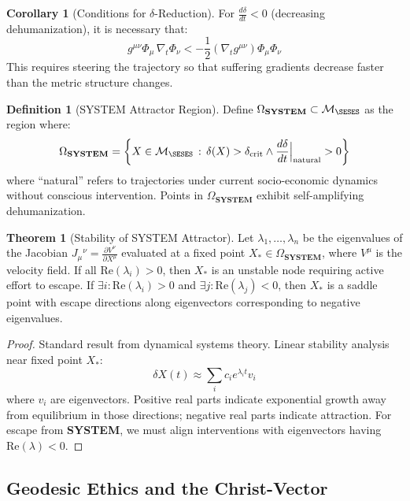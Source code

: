\documentclass[11pt,a4paper]{article}
\newcommand{\SYSTEM}{\textbf{SYSTEM}}
\theoremstyle{definition}
\newtheorem{definition}{Definition}[section]
\newtheorem{theorem}{Theorem}[section]
\newtheorem{corollary}{Corollary}[theorem]
\theoremstyle{remark}
\begin{document}
\begin{corollary}[Conditions for $\delta$-Reduction]
For $\frac{d\delta}{dt} < 0$ (decreasing dehumanization), it is necessary that:
\[
g^{\mu\nu} \Phi_\mu \, \nabla_t \Phi_\nu < -\frac{1}{2} \left( \nabla_t g^{\mu\nu} \right) \Phi_\mu \Phi_\nu
\]
This requires steering the trajectory so that suffering gradients decrease faster than the metric structure changes.
\end{corollary}

\begin{definition}[SYSTEM Attractor Region]
Define $\Omega_{\SYSTEM} \subset \mathcal{M}_{\SESES}$ as the region where:
\[
\Omega_{\SYSTEM} = \left\{ X \in \mathcal{M}_{\SESES} \,:\, \delta(X) > \delta_{\text{crit}} \wedge \frac{d\delta}{dt}\Big|_{\text{natural}} > 0 \right\}
\]
where ``natural'' refers to trajectories under current socio-economic dynamics without conscious intervention. Points in $\Omega_{\SYSTEM}$ exhibit self-amplifying dehumanization.
\end{definition}

\begin{theorem}[Stability of SYSTEM Attractor]
Let $\lambda_1, \ldots, \lambda_n$ be the eigenvalues of the Jacobian $J_\mu{}^\nu = \frac{\partial V^\nu}{\partial X^\mu}$ evaluated at a fixed point $X_* \in \Omega_{\SYSTEM}$, where $V^\mu$ is the velocity field. If all $\text{Re}(\lambda_i) > 0$, then $X_*$ is an unstable node requiring active effort to escape. If $\exists i : \text{Re}(\lambda_i) > 0$ and $\exists j : \text{Re}(\lambda_j) < 0$, then $X_*$ is a saddle point with escape directions along eigenvectors corresponding to negative eigenvalues.
\end{theorem}

\begin{proof}
Standard result from dynamical systems theory. Linear stability analysis near fixed point $X_*$:
\[
\delta X(t) \approx \sum_i c_i e^{\lambda_i t} v_i
\]
where $v_i$ are eigenvectors. Positive real parts indicate exponential growth away from equilibrium in those directions; negative real parts indicate attraction. For escape from \SYSTEM, we must align interventions with eigenvectors having $\text{Re}(\lambda) < 0$.
\end{proof}

\subsection{Geodesic Ethics and the Christ-Vector}
\label{app:geodesic_ethics}
\end{document}
